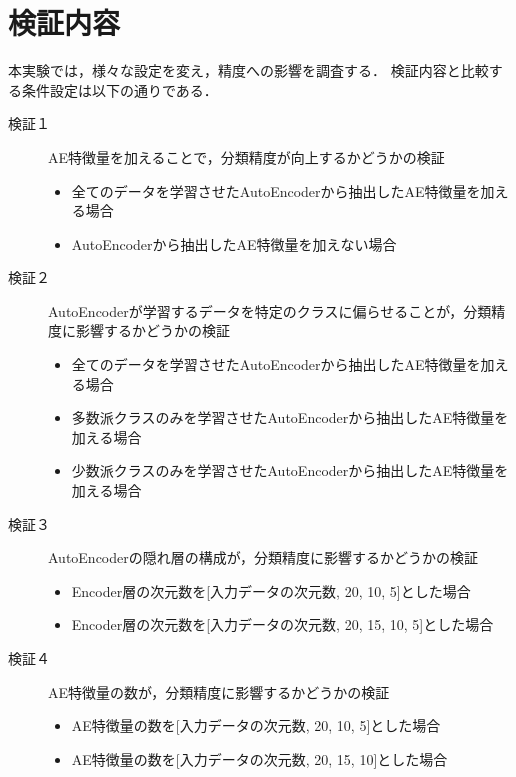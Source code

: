 \section{検証内容}
本実験では，様々な設定を変え，精度への影響を調査する．
検証内容と比較する条件設定は以下の通りである．

\begin{description}
    \item [検証１] AE特徴量を加えることで，分類精度が向上するかどうかの検証
    \begin{itemize}
        \item 全てのデータを学習させたAutoEncoderから抽出したAE特徴量を加える場合
        \item AutoEncoderから抽出したAE特徴量を加えない場合
    \end{itemize}

    \item [検証２] AutoEncoderが学習するデータを特定のクラスに偏らせることが，分類精度に影響するかどうかの検証
    \begin{itemize}
        \item 全てのデータを学習させたAutoEncoderから抽出したAE特徴量を加える場合
        \item 多数派クラスのみを学習させたAutoEncoderから抽出したAE特徴量を加える場合
        \item 少数派クラスのみを学習させたAutoEncoderから抽出したAE特徴量を加える場合
    \end{itemize}

    \item [検証３] AutoEncoderの隠れ層の構成が，分類精度に影響するかどうかの検証
    \begin{itemize}
        \item Encoder層の次元数を[入力データの次元数, 20, 10, 5]とした場合
        \item Encoder層の次元数を[入力データの次元数, 20, 15, 10, 5]とした場合
    \end{itemize}

    \item [検証４] AE特徴量の数が，分類精度に影響するかどうかの検証
    \begin{itemize}
        \item AE特徴量の数を[入力データの次元数, 20, 10, 5]とした場合
        \item AE特徴量の数を[入力データの次元数, 20, 15, 10]とした場合
    \end{itemize}


\end{description}
